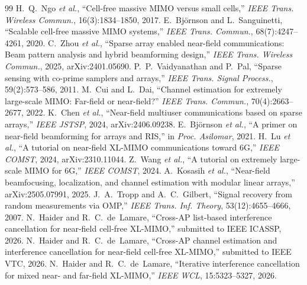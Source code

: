 \documentclass[11pt]{article}
\begin{document}
\begin{thebibliography}{99}\small
{} H.~Q.~Ngo \emph{et al.}, ``Cell-free massive MIMO versus small cells,'' \emph{IEEE Trans. Wireless Commun.}, 16(3):1834--1850, 2017.
 E.~Bj\"ornson and L.~Sanguinetti, ``Scalable cell-free massive MIMO systems,'' \emph{IEEE Trans. Commun.}, 68(7):4247--4261, 2020.
 C.~Zhou \emph{et al.}, ``Sparse array enabled near-field communications: Beam pattern analysis and hybrid beamforming design,'' \emph{IEEE Trans. Wireless Commun.}, 2025, arXiv:2401.05690.
 P.~P.~Vaidyanathan and P.~Pal, ``Sparse sensing with co-prime samplers and arrays,'' \emph{IEEE Trans. Signal Process.}, 59(2):573--586, 2011.
 M.~Cui and L.~Dai, ``Channel estimation for extremely large-scale MIMO: Far-field or near-field?'' \emph{IEEE Trans. Commun.}, 70(4):2663--2677, 2022.
 K.~Chen \emph{et al.}, ``Near-field multiuser communications based on sparse arrays,'' \emph{IEEE JSTSP}, 2024, arXiv:2406.09238.
 E.~Bj\"ornson \emph{et al.}, ``A primer on near-field beamforming for arrays and RIS,'' in \emph{Proc. Asilomar}, 2021.
 H.~Lu \emph{et al.}, ``A tutorial on near-field XL-MIMO communications toward 6G,'' \emph{IEEE COMST}, 2024, arXiv:2310.11044.
 Z.~Wang \emph{et al.}, ``A tutorial on extremely large-scale MIMO for 6G,'' \emph{IEEE COMST}, 2024.
 A.~Kosasih \emph{et al.}, ``Near-field beamfocusing, localization, and channel estimation with modular linear arrays,'' arXiv:2505.07991, 2025.
 J.~A.~Tropp and A.~C.~Gilbert, ``Signal recovery from random measurements via OMP,'' \emph{IEEE Trans. Inf. Theory}, 53(12):4655--4666, 2007.
 N.~Haider and R.~C.~de~Lamare, ``Cross-AP list-based interference cancellation for near-field cell-free XL-MIMO,'' submitted to IEEE ICASSP, 2026.
 N.~Haider and R.~C.~de~Lamare, ``Cross-AP channel estimation and interference cancellation for near-field cell-free XL-MIMO,'' submitted to IEEE VTC, 2026.
 N.~Haider and R.~C.~de~Lamare, ``Iterative interference cancellation for mixed near- and far-field XL-MIMO,'' \emph{IEEE WCL}, 15:5323--5327, 2026.
\end{thebibliography}
\end{document}
